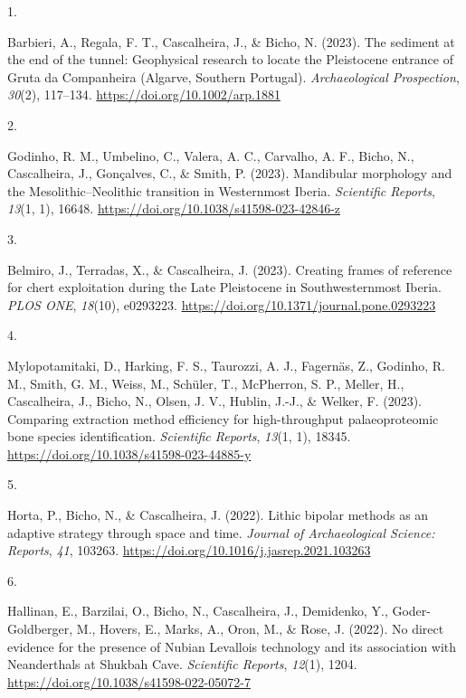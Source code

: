 \documentclass[11pt,a4paper,]{awesome-cv}
\newlength{\cslhangindent}
\newlength{\csllabelwidth}
\newenvironment{CSLReferences}[2] %
 {\begin{list}{}{%
  \setlength{\itemindent}{0pt}
  \setlength{\leftmargin}{0pt}
  \setlength{\parsep}{0pt}
  \ifodd #1
   \setlength{\leftmargin}{\cslhangindent}
   \setlength{\itemindent}{-1\cslhangindent}
  \fi
  \setlength{\itemsep}{#2\baselineskip}}}
 {\end{list}}
\newcommand{\CSLLeftMargin}[1]{\parbox[t]{\csllabelwidth}{\strut#1\strut}}
\newcommand{\CSLRightInline}[1]{\parbox[t]{\linewidth - \csllabelwidth}{\strut#1\strut}}
\begin{document}
\label{refs-dc48c4db13c9df2a4d2453784920a95a}
\begin{CSLReferences}{0}{0}
\CSLLeftMargin{1. }%
\CSLRightInline{Barbieri, A., Regala, F. T., Cascalheira, J., \& Bicho,
N. (2023). The sediment at the end of the tunnel: Geophysical research
to locate the Pleistocene entrance of Gruta da Companheira (Algarve,
Southern Portugal). \emph{Archaeological Prospection}, \emph{30}(2),
117--134. \url{https://doi.org/10.1002/arp.1881}}

\CSLLeftMargin{2. }%
\CSLRightInline{Godinho, R. M., Umbelino, C., Valera, A. C., Carvalho,
A. F., Bicho, N., Cascalheira, J., Gonçalves, C., \& Smith, P. (2023).
Mandibular morphology and the Mesolithic--Neolithic transition in
Westernmost Iberia. \emph{Scientific Reports}, \emph{13}(1, 1), 16648.
\url{https://doi.org/10.1038/s41598-023-42846-z}}

\CSLLeftMargin{3. }%
\CSLRightInline{Belmiro, J., Terradas, X., \& Cascalheira, J. (2023).
Creating frames of reference for chert exploitation during the Late
Pleistocene in Southwesternmost Iberia. \emph{PLOS ONE}, \emph{18}(10),
e0293223. \url{https://doi.org/10.1371/journal.pone.0293223}}

\CSLLeftMargin{4. }%
\CSLRightInline{Mylopotamitaki, D., Harking, F. S., Taurozzi, A. J.,
Fagernäs, Z., Godinho, R. M., Smith, G. M., Weiss, M., Schüler, T.,
McPherron, S. P., Meller, H., Cascalheira, J., Bicho, N., Olsen, J. V.,
Hublin, J.-J., \& Welker, F. (2023). Comparing extraction method
efficiency for high-throughput palaeoproteomic bone species
identification. \emph{Scientific Reports}, \emph{13}(1, 1), 18345.
\url{https://doi.org/10.1038/s41598-023-44885-y}}

\CSLLeftMargin{5. }%
\CSLRightInline{Horta, P., Bicho, N., \& Cascalheira, J. (2022). Lithic
bipolar methods as an adaptive strategy through space and time.
\emph{Journal of Archaeological Science: Reports}, \emph{41}, 103263.
\url{https://doi.org/10.1016/j.jasrep.2021.103263}}

\CSLLeftMargin{6. }%
\CSLRightInline{Hallinan, E., Barzilai, O., Bicho, N., Cascalheira, J.,
Demidenko, Y., Goder-Goldberger, M., Hovers, E., Marks, A., Oron, M., \&
Rose, J. (2022). No direct evidence for the presence of Nubian Levallois
technology and its association with Neanderthals at Shukbah Cave.
\emph{Scientific Reports}, \emph{12}(1), 1204.
\url{https://doi.org/10.1038/s41598-022-05072-7}}


\end{CSLReferences}
\end{document}
